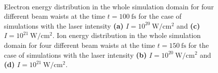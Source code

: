 \begin{figure}[h!]
	\centering
	\hspace{1mm}
	\\[2mm]
	\hspace{1mm}
	\caption{Electron energy distribution in the whole simulation domain for four different beam waists at the time $ t = 100 \ \mathrm{fs} $ for the case of simulations with the laser intensity \textbf{(a)} $ I = 10^{20} \ \mathrm{W/cm^2} $ and \textbf{(c)} $ I = 10^{21} \ \mathrm{W/cm^2} $. Ion energy distribution in the whole simulation domain for four different beam waists at the time $ t = 150 \ \mathrm{fs} $ for the case of simulations with the laser intensity \textbf{(b)} $ I = 10^{20} \ \mathrm{W/cm^2} $ and \textbf{(d)} $ I = 10^{21} \ \mathrm{W/cm^2} $.}
	\label{fig:14}
\end{figure}

